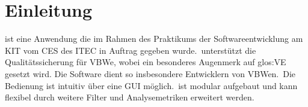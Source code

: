 \chapter{Einleitung}
\begin{normalsize}

\projektTitel ist eine Anwendung die im Rahmen des Praktikums der Softwareentwicklung am \gls{KIT} vom \gls{CES} des \gls{ITEC} in Auftrag gegeben wurde.\
\projektTitel unterstützt die Qualitätssicherung für \gls{VBW}e, wobei ein besonderes Augenmerk auf \gls{glos:VE} gesetzt wird. Die Software dient so insbesondere Entwicklern von \gls{VBW}en.\
Die Bedienung ist intuitiv über eine GUI möglich.\
\projektTitel ist modular aufgebaut und kann flexibel durch weitere Filter und Analysemetriken erweitert werden.

\end{normalsize}


